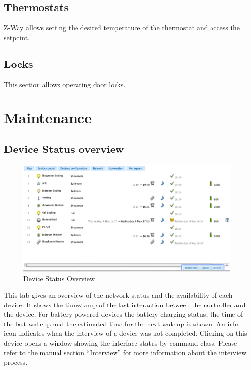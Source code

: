 \subsection{Thermostats}

Z-Way allows setting the desired temperature of the thermostat and access the setpoint.

\subsection{Locks}

This section allows operating door locks.

\section{Maintenance}

\subsection{Device Status overview}

\begin{figure} 
\begin{center}
\includegraphics[scale=0.7]{pics/devicestatus.png}
\caption{Device Status Overview}
\end{center} 
\end{figure}

This tab gives an overview of the network status and the availability of each device. It shows the 
timestamp of the last interaction between the controller and the device. For battery powered devices the 
battery charging status, the time of the last wakeup and the estimated time for the next wakeup is shown.
An info icon indicates when the interview of a device was not completed. Clicking on this device opens 
a window showing the interface status by command class. Please refer to the manual section “Interview” 
for more information about the interview process.

